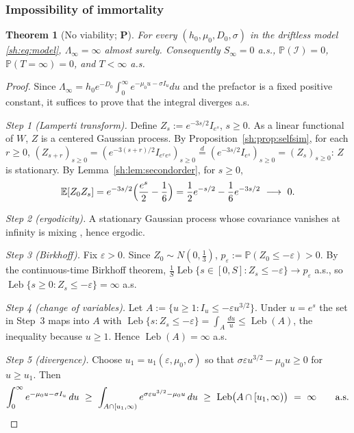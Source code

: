 \documentclass[11pt]{article}
\numberwithin{equation}{section}
\theoremstyle{plain}
\newtheorem{theorem}{Theorem}[section]
\theoremstyle{definition}
\theoremstyle{remark}
\newcommand{\E}{\mathbb{E}}
\newcommand{\PP}{\mathbb{P}}
\DeclareMathOperator{\Leb}{Leb}
\newcommand{\eqd}{\overset{d}{=}}
\newcommand{\Imm}{\mathcal{I}}
\begin{document}
\subsubsection{Impossibility of immortality}\label{sh:subsub:noimm}

\begin{theorem}[No viability; \textbf{P}]\label{sh:thm:noimm}
For every $(h_0,\mu_0,D_0,\sigma)$ in the driftless model
\eqref{sh:eq:model}, $\Lambda_\infty=\infty$ almost surely. Consequently
$S_\infty=0$ a.s., $\PP(\Imm)=0$, $\PP(T=\infty)=0$, and $T<\infty$ a.s.
\end{theorem}

\begin{proof}
Since $\Lambda_\infty=h_0e^{-D_0}\int_0^\infty e^{-\mu_0u-\sigma I_u}du$
and the prefactor is a fixed positive constant, it suffices to prove that
the integral diverges a.s.

\emph{Step 1 (Lamperti transform).} Define $Z_s:=e^{-3s/2}I_{e^s}$,
$s\ge0$. As a linear functional of $W$, $Z$ is a centered Gaussian process.
By Proposition~\ref{sh:prop:selfsim}, for each $r\ge0$,
$(Z_{s+r})_{s\ge0}=(e^{-3(s+r)/2}I_{e^re^s})_{s\ge0}
\eqd(e^{-3s/2}I_{e^s})_{s\ge0}=(Z_s)_{s\ge0}$: $Z$ is stationary. By
Lemma~\ref{sh:lem:secondorder}, for $s\ge0$,
\begin{equation}\label{sh:eq:lampcov}
\E[Z_0Z_s]=e^{-3s/2}\Bigl(\frac{e^{s}}{2}-\frac16\Bigr)
=\frac12e^{-s/2}-\frac16e^{-3s/2}\ \longrightarrow\ 0 .
\end{equation}

\emph{Step 2 (ergodicity).} A stationary Gaussian process whose covariance
vanishes at infinity is mixing \cite{Mar49}, hence ergodic.

\emph{Step 3 (Birkhoff).} Fix $\varepsilon>0$. Since
$Z_0\sim N(0,\tfrac13)$, $p_\varepsilon:=\PP(Z_0\le-\varepsilon)>0$. By the
continuous-time Birkhoff theorem,
$\tfrac1S\Leb\{s\in[0,S]:Z_s\le-\varepsilon\}\to p_\varepsilon$ a.s., so
$\Leb\{s\ge0:Z_s\le-\varepsilon\}=\infty$ a.s.

\emph{Step 4 (change of variables).} Let
$A:=\{u\ge1:I_u\le-\varepsilon u^{3/2}\}$. Under $u=e^s$ the set in Step~3
maps into $A$ with
$\Leb\{s:Z_s\le-\varepsilon\}=\int_A\frac{du}{u}\le\Leb(A)$,
the inequality because $u\ge1$. Hence $\Leb(A)=\infty$ a.s.

\emph{Step 5 (divergence).} Choose $u_1=u_1(\varepsilon,\mu_0,\sigma)$ so
that $\sigma\varepsilon u^{3/2}-\mu_0u\ge0$ for $u\ge u_1$. Then
\[
\int_0^\infty e^{-\mu_0u-\sigma I_u}\,du
\ \ge\ \int_{A\cap[u_1,\infty)}e^{\sigma\varepsilon u^{3/2}-\mu_0u}\,du
\ \ge\ \Leb\bigl(A\cap[u_1,\infty)\bigr)\ =\ \infty
\qquad\text{a.s.}\qedhere
\]
\end{proof}
\end{document}
